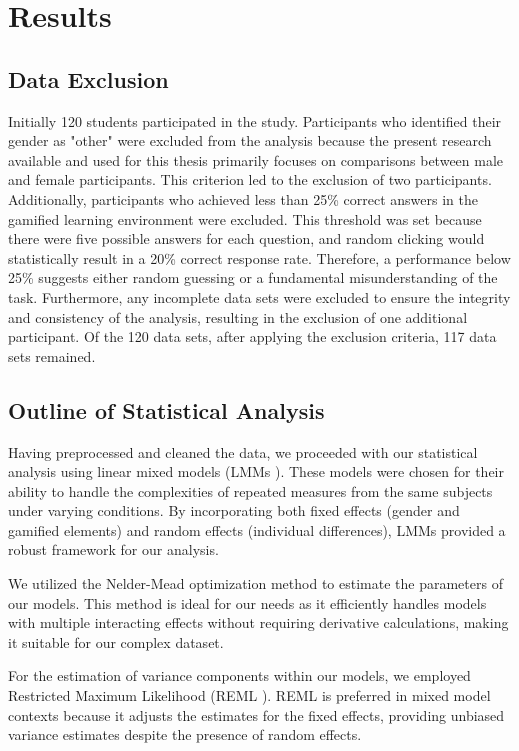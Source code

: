 
\section{Results}
\label{chap:evaluation}
\subsection{Data Exclusion}
Initially 120 students participated in the study.
Participants who identified their gender as "other" were excluded from the analysis because the present research available and used for this thesis primarily focuses on comparisons between male and female participants.
This criterion led to the exclusion of two participants. Additionally, participants who achieved less than 25\% correct answers in the gamified learning environment were excluded.
This threshold was set because there were five possible answers for each question, and random clicking would statistically result in a 20\% correct response rate.
Therefore, a performance below 25\% suggests either random guessing or a fundamental misunderstanding of the task.
Furthermore, any incomplete data sets were excluded to ensure the integrity and consistency of the analysis, resulting in the exclusion of one additional participant.
Of the 120 data sets, after applying the exclusion criteria, 117 data sets remained.

\subsection{Outline of Statistical Analysis}
Having preprocessed and cleaned the data, we proceeded with our statistical analysis using linear mixed models (LMMs \textcite{deanGeneralizedLinearMixed2007}).
These models were chosen for their ability to handle the complexities of repeated measures from the same subjects under varying conditions.
By incorporating both fixed effects (gender and gamified elements) and random effects (individual differences), LMMs provided a robust framework for our analysis.

We utilized the Nelder-Mead \parencite{nelderSimplexMethodFunction1965} optimization method to estimate the parameters of our models.
This method is ideal for our needs as it efficiently handles models with multiple interacting effects without requiring derivative calculations, making it suitable for our complex dataset.

For the estimation of variance components within our models, we employed Restricted Maximum Likelihood (REML \textcite{corbeilRestrictedMaximumLikelihood1976}).
REML is preferred in mixed model contexts because it adjusts the estimates for the fixed effects, providing unbiased variance estimates despite the presence of random effects.

